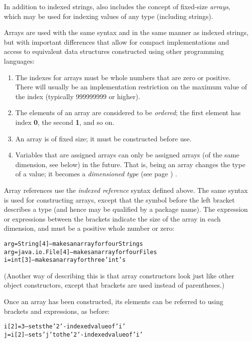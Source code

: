 In addition to indexed strings, \nr{} also includes the concept of
fixed-size \emph{arrays}, which may be used for indexing values of any
type (including strings).
 
Arrays are used with the same syntax and in the same manner as
indexed strings, but with important differences that allow for
compact implementations and access to equivalent data structures
constructed using other programming languages:
\begin{enumerate}
\item 
The indexes for arrays must be whole numbers that are zero or positive.
There will usually be an implementation restriction on the maximum value
of the index (typically 999999999 or higher).
\item 
The elements of an array are considered to be \emph{ordered}; the
first element has index \textbf{0}, the second \textbf{1}, and so on.
\item 
An array is of fixed size;
it must be constructed before use.
\item 
Variables that are assigned arrays can only be assigned arrays (of the
same dimension, see below) in the future.  That is, being an array
changes the type of a value; it becomes a
 \emph{dimensioned type} (see page \pageref{refdimtype}) .
\end{enumerate}
 
Array references use the \nr{} \emph{indexed reference} syntax
defined above.  The same syntax is used for constructing arrays, except
that the symbol before the left bracket describes a type (and hence may
be qualified by a package name).  The expression or expressions between
the brackets indicate the size of the array in each dimension, and must
be a positive whole number or zero:
\begin{alltt}
arg=String[4]       -- makes an array for four Strings
arg=java.io.File[4] -- makes an array for four Files
i=int[3]            -- makes an array for three 'int's
\end{alltt}

(Another way of describing this is that array constructors look
just like other object constructors, except that brackets are
used instead of parentheses.)
 
Once an array has been constructed, its elements can be referred to
using brackets and expressions, as before:
\begin{alltt}
i[2]=3 -- sets the '2'-indexed value of 'i'
j=i[2] -- sets 'j' to the '2'-indexed value of 'i'
\end{alltt}
 
